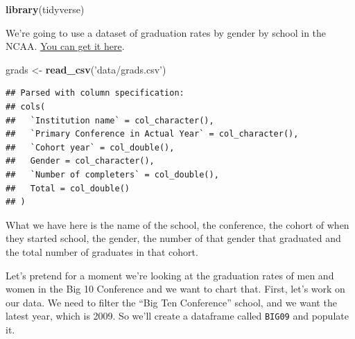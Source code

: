 \documentclass[]{book}
\newenvironment{Shaded}{\begin{snugshade}}{\end{snugshade}}
\newcommand{\DataTypeTok}[1]{\textcolor[rgb]{0.13,0.29,0.53}{#1}}
\newcommand{\DecValTok}[1]{\textcolor[rgb]{0.00,0.00,0.81}{#1}}
\newcommand{\KeywordTok}[1]{\textcolor[rgb]{0.13,0.29,0.53}{\textbf{#1}}}
\newcommand{\NormalTok}[1]{#1}
\newcommand{\OperatorTok}[1]{\textcolor[rgb]{0.81,0.36,0.00}{\textbf{#1}}}
\newcommand{\StringTok}[1]{\textcolor[rgb]{0.31,0.60,0.02}{#1}}
\begin{document}
\begin{Shaded}
\begin{Highlighting}[]
\KeywordTok{library}\NormalTok{(tidyverse)}
\end{Highlighting}
\end{Shaded}

We're going to use a dataset of graduation rates by gender by school in the NCAA. \href{https://unl.box.com/s/3nw1eokvs9zfdjyzvjaj3xdq01rm8sym}{You can get it here}.

\begin{Shaded}
\begin{Highlighting}[]
\NormalTok{grads <-}\StringTok{ }\KeywordTok{read_csv}\NormalTok{(}\StringTok{'data/grads.csv'}\NormalTok{)}
\end{Highlighting}
\end{Shaded}

\begin{verbatim}
## Parsed with column specification:
## cols(
##   `Institution name` = col_character(),
##   `Primary Conference in Actual Year` = col_character(),
##   `Cohort year` = col_double(),
##   Gender = col_character(),
##   `Number of completers` = col_double(),
##   Total = col_double()
## )
\end{verbatim}

What we have here is the name of the school, the conference, the cohort of when they started school, the gender, the number of that gender that graduated and the total number of graduates in that cohort.

Let's pretend for a moment we're looking at the graduation rates of men and women in the Big 10 Conference and we want to chart that. First, let's work on our data. We need to filter the ``Big Ten Conference'' school, and we want the latest year, which is 2009. So we'll create a dataframe called \texttt{BIG09} and populate it.

\begin{Shaded}
\end{Shaded}
\end{document}
